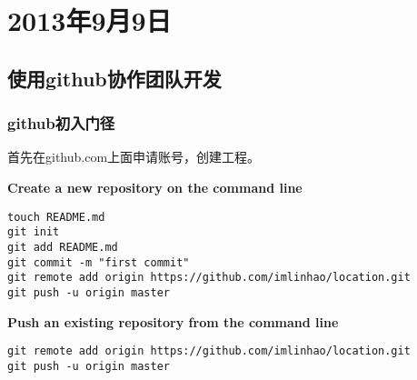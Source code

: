 \chapter{2013年9月9日}
\section{使用github协作团队开发}
\subsection{github初入门径}
首先在github.com上面申请账号，创建工程。

\textbf{Create a new repository on the command line}
\begin{lstlisting}
touch README.md
git init
git add README.md
git commit -m "first commit"
git remote add origin https://github.com/imlinhao/location.git
git push -u origin master
\end{lstlisting}

\textbf{Push an existing repository from the command line}
\begin{lstlisting}
git remote add origin https://github.com/imlinhao/location.git
git push -u origin master
\end{lstlisting}

